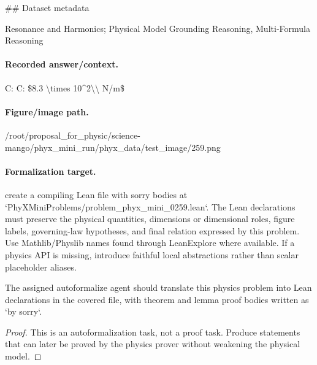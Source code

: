 \#\# Dataset metadata

Resonance and Harmonics; Physical Model Grounding Reasoning, Multi-Formula Reasoning

\paragraph{Recorded answer/context.}
C: C: \$8.3 \textbackslash{}times 10\textasciicircum{}2\textbackslash{}\textbackslash{} N/m\$

\paragraph{Figure/image path.}
/root/proposal\_for\_physic/science-mango/phyx\_mini\_run/phyx\_data/test\_image/259.png

\paragraph{Formalization target.}
create a compiling Lean file with sorry bodies at `PhyXMiniProblems/problem\_phyx\_mini\_0259.lean`. The Lean declarations must preserve the physical quantities, dimensions or dimensional roles, figure labels, governing-law hypotheses, and final relation expressed by this problem.
Use Mathlib/Physlib names found through LeanExplore where available. If a physics API is missing, introduce faithful local abstractions rather than scalar placeholder aliases.

\begin{theorem}
\label{thm:physics:phyx_mini_0259:target}
The assigned autoformalize agent should translate this physics problem into Lean declarations in the covered file, with theorem and lemma proof bodies written as `by sorry`.
\end{theorem}
\begin{proof}
This is an autoformalization task, not a proof task. Produce statements that can later be proved by the physics prover without weakening the physical model.
\end{proof}

